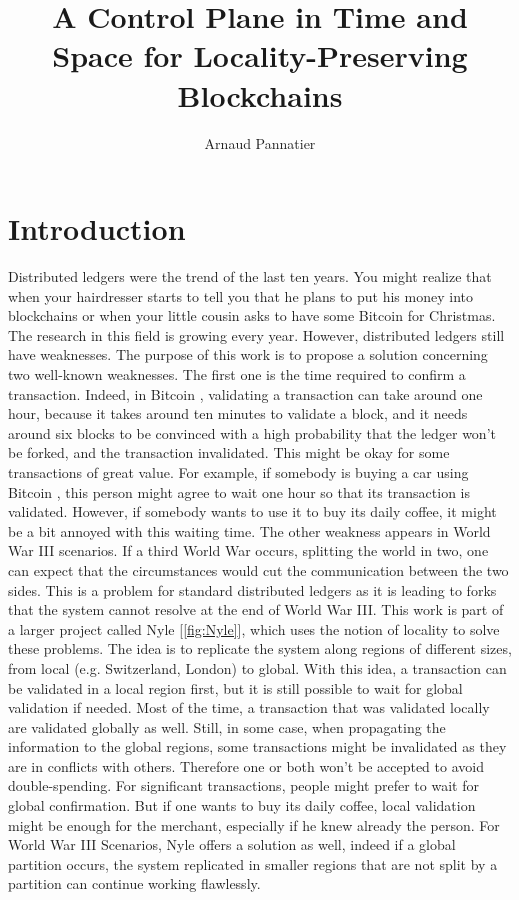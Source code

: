 \documentclass[a4paper,11pt,oneside]{report}
\title{A Control Plane in Time and Space for Locality-Preserving Blockchains}
\author{Arnaud Pannatier}
\begin{document}
\maketitle 

\maketoc

\chapter{Introduction} %

Distributed ledgers were the trend of the last ten years. You might realize
that when your hairdresser starts to tell you that he plans to put his money
into blockchains or when your little cousin asks to have some Bitcoin
\cite{Nakamoto2009} for Christmas. The research in this field is growing every
year. However, distributed ledgers still have weaknesses. The purpose of this
work is to propose a solution concerning two well-known weaknesses. The first
one is the time required to confirm a transaction. Indeed, in Bitcoin
\cite{Nakamoto2009}, validating a transaction can take around one hour, because
it takes around ten minutes to validate a block, and it needs around six blocks
to be convinced with a high probability that the ledger won't be forked, and
the transaction invalidated. This might be okay for some transactions of great
value. For example, if somebody is buying a car using Bitcoin
\cite{Nakamoto2009}, this person might agree to wait one hour so that its
transaction is validated. However, if somebody wants to use it to buy its daily
coffee, it might be a bit annoyed with this waiting time. The other weakness
appears in World War III scenarios. If a third World War occurs, splitting the
world in two, one can expect that the circumstances would cut the communication between the two sides. This is a problem for standard distributed ledgers as it is leading to
forks that the system cannot resolve at the end of World War III. This work is part of
a larger project called Nyle [\autoref{fig:Nyle}], which uses the notion of
locality to solve these problems. The idea is to replicate the system along
regions of different sizes, from local (e.g. Switzerland, London) to global.
With this idea, a transaction can be validated in a local region first, but it
is still possible to wait for global validation if needed. Most of the time, a
transaction that was validated locally are validated globally as well. Still, in some case, when propagating the information to the global regions, some
transactions might be invalidated as they are in conflicts with others. Therefore one or both won't be accepted to avoid double-spending. For significant
transactions, people might prefer to wait for global confirmation. But if one
wants to buy its daily coffee, local validation might be enough for the
merchant, especially if he knew already the person. For World War III
Scenarios, Nyle offers a solution as well, indeed if a global partition occurs,
the system replicated in smaller regions that are not split
by a partition can continue working flawlessly. 
\end{document}
